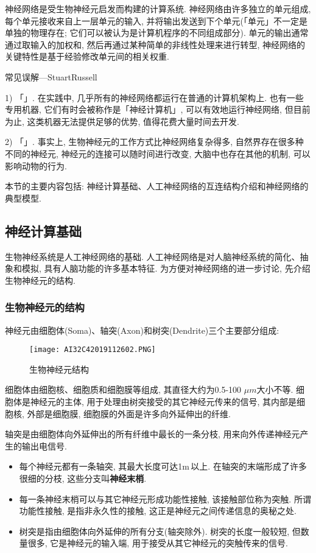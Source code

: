 神经网络是受生物神经元启发而构建的计算系统. 神经网络由许多独立的单元组成, 每个单元接收来自上一层单元的输入, 并将输出发送到下个单元(「单元」不一定是单独的物理存在;
它们可以被认为是计算机程序的不同组成部分). 单元的输出通常通过取输入的加权和, 然后再通过某种简单的非线性处理来进行转型, 神经网络的关键特性是基于经验修改单元间的相关权重.

\textcolor[rgb]{0,0,1}{常见误解---StuartRussell}

1) 「」. 在实践中, 几乎所有的神经网络都运行在普通的计算机架构上. 也有一些专用机器, 它们有时会被称作是「神经计算机」, 可以有效地运行神经网络, 但目前为止, 这类机器无法提供足够的优势, 值得花费大量时间去开发.

2) 「」. 事实上, 生物神经元的工作方式比神经网络复杂得多, 自然界存在很多种不同的神经元, 神经元的连接可以随时间进行改变, 大脑中也存在其他的机制, 可以影响动物的行为.

本节的主要内容包括: 神经计算基础、人工神经网络的互连结构介绍和神经网络的典型模型.
\subsection{神经计算基础}
生物神经系统是人工神经网络的基础. 人工神经网络是对人脑神经系统的简化、抽象和模拟, 具有人脑功能的许多基本特征.
为方便对神经网络的进一步讨论, 先介绍生物神经元的结构.
\subsubsection{生物神经元的结构}
神经元由细胞体(Soma)、轴突(Axon)和树突(Dendrite)三个主要部分组成:
\begin{figure}[H]
\centering
\texttt{[image: AI32C42019112602.PNG]}
\caption{生物神经元结构}
\label{AI32fig2602}
\end{figure}
细胞体由细胞核、细胞质和细胞膜等组成, 其直径大约为0.5-100 $\si{\mu m}$大小不等. 细胞体是神经元的主体, 用于处理由树突接受的其它神经元传来的信号, 其内部是细胞核, 外部是细胞膜, 细胞膜的外面是许多向外延伸出的纤维.

轴突是由细胞体向外延伸出的所有纤维中最长的一条分枝, 用来向外传递神经元产生的输出电信号.
\begin{itemize}
\item 每个神经元都有一条轴突, 其最大长度可达1\si{m}\,以上. 在轴突的末端形成了许多很细的分枝, 这些分支叫\textbf{神经末梢}.
\item 每一条神经末梢可以与其它神经元形成功能性接触, 该接触部位称为突触. 所谓功能性接触, 是指非永久性的接触, 这正是神经元之间传递信息的奥秘之处.
\item 树突是指由细胞体向外延伸的所有分支(轴突除外). 树突的长度一般较短, 但数量很多, 它是神经元的输入端, 用于接受从其它神经元的突触传来的信号.
\end{itemize}
